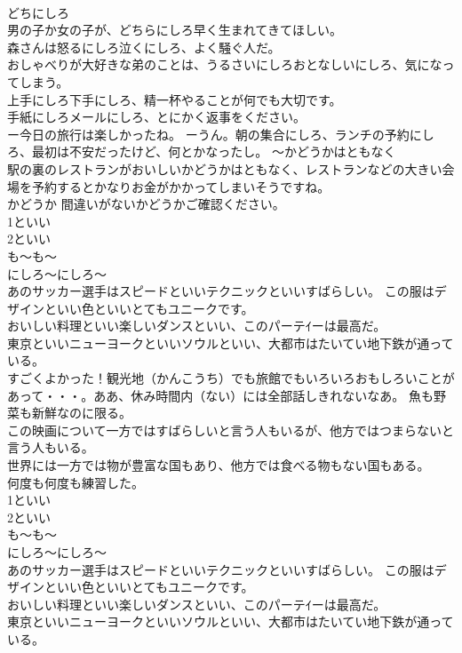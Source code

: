 \documentclass[8pt]{extreport}
\begin{document}
\begin{CJK}{UTF8}{min}
\\	どちにしろ 
\\	男の子か女の子が、どちらにしろ早く生まれてきてほしい。 
\\	森さんは怒るにしろ泣くにしろ、よく騒ぐ人だ。 
\\	おしゃべりが大好きな弟のことは、うるさいにしろおとなしいにしろ、気になってしまう。 
\\	上手にしろ下手にしろ、精一杯やることが何でも大切です。 
\\	手紙にしろメールにしろ、とにかく返事をください。 
\\	ー今日の旅行は楽しかったね。 ーうん。朝の集合にしろ、ランチの予約にしろ、最初は不安だったけど、何とかなったし。 ～かどうかはともなく 
\\	駅の裏のレストランがおいしいかどうかはともなく、レストランなどの大きい会場を予約するとかなりお金がかかってしまいそうですね。 
\\	かどうか 間違いがないかどうかご確認ください。
\\	1といい
\\	2といい 
\\	も～も～ 
\\	にしろ～にしろ～ 
\\	あのサッカー選手はスピードといいテクニックといいすばらしい。 この服はデザインといい色といいとてもユニークです。 
\\	おいしい料理といい楽しいダンスといい、このパーテｲーは最高だ。 
\\	東京といいニューヨークといいソウルといい、大都市はたいてい地下鉄が通っている。 
\\	すごくよかった！観光地（かんこうち）でも旅館でもいろいろおもしろいことがあって・・・。ああ、休み時間内（ない）には全部話しきれないなあ。 魚も野菜も新鮮なのに限る。 
\\	この映画について一方ではすばらしいと言う人もいるが、他方ではつまらないと言う人もいる。 
\\	世界には一方では物が豊富な国もあり、他方では食べる物もない国もある。 
\\	何度も何度も練習した。
\\	1といい
\\	2といい	
\\	も～も～ 
\\	にしろ～にしろ～ 
\\	あのサッカー選手はスピードといいテクニックといいすばらしい。 この服はデザインといい色といいとてもユニークです。 
\\	おいしい料理といい楽しいダンスといい、このパーテｲーは最高だ。 
\\	東京といいニューヨークといいソウルといい、大都市はたいてい地下鉄が通っている。 

\end{CJK}
\end{document}
